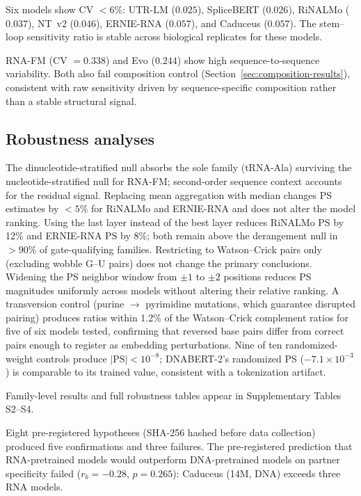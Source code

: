 \documentclass[11pt]{article}
\begin{document}
Six models show CV $< 6$\%: UTR-LM ($0.025$), SpliceBERT ($0.026$),
RiNALMo ($0.037$), NT~v2 ($0.046$), ERNIE-RNA ($0.057$), and Caduceus
($0.057$). The stem--loop sensitivity ratio is stable across biological
replicates for these models.

RNA-FM (CV $= 0.338$) and Evo ($0.244$) show high sequence-to-sequence
variability. Both also fail composition control
(Section~\ref{sec:composition-results}), consistent with raw sensitivity
driven by sequence-specific composition rather than a stable structural
signal.


\subsection{Robustness analyses}
\label{sec:robustness}

The dinucleotide-stratified null absorbs the sole family (tRNA-Ala)
surviving the nucleotide-stratified null for RNA-FM; second-order sequence
context accounts for the residual signal. Replacing
mean aggregation with median changes PS estimates by $< 5$\% for RiNALMo
and ERNIE-RNA and does not alter the model ranking. Using the last layer
instead of the best layer reduces RiNALMo PS by 12\% and ERNIE-RNA PS by
8\%; both remain above the derangement null in $> 90$\% of gate-qualifying
families. Restricting to Watson--Crick pairs only (excluding wobble G--U
pairs) does not change the primary conclusions. Widening the PS neighbor
window from $\pm 1$ to $\pm 2$ positions reduces PS magnitudes uniformly
across models without altering their relative ranking.
A transversion control (purine $\to$ pyrimidine mutations, which
guarantee disrupted pairing) produces ratios within 1.2\% of the
Watson--Crick complement ratios for five of six models tested,
confirming that reversed base pairs differ from correct pairs enough
to register as embedding perturbations. Nine of ten
randomized-weight controls produce $|\text{PS}| < 10^{-8}$; DNABERT-2's
randomized PS ($-7.1 \times 10^{-3}$) is comparable to its trained value,
consistent with a tokenization artifact.

Family-level results and full robustness tables appear in Supplementary
Tables S2--S4.


Eight pre-registered hypotheses (SHA-256 hashed before data collection)
produced five confirmations and three failures.
The pre-registered prediction that RNA-pretrained models would
outperform DNA-pretrained models on partner specificity failed
($r_b = -0.28$, $p = 0.265$): Caduceus (14M, DNA) exceeds three RNA
models.
\end{document}

